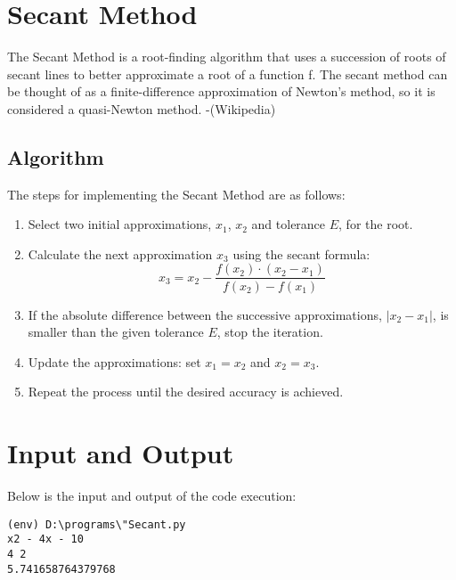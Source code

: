 \documentclass[12pt]{article}
\begin{document}
    
    \newpage
    \section*{Secant Method}

    
    The Secant Method is a root-finding algorithm that uses a succession of roots of secant lines to better approximate a root of a function f. The secant method can be thought of as a finite-difference approximation of Newton's method, so it is considered a quasi-Newton method. -(Wikipedia)
    
    \subsection*{Algorithm}
    The steps for implementing the Secant Method are as follows:
    
    \begin{enumerate}
        \item Select two initial approximations, \(x_1\), \(x_2\) and tolerance \(E\), for the root.
        \item Calculate the next approximation \(x_3\) using the secant formula:
        \[
            x_3 = x_2 - \frac{f(x_2) \cdot (x_2 - x_1)}{f(x_2) - f(x_1)}
        \]
            \item If the absolute difference between the successive approximations, \(|x_2 - x_1|\), is smaller than the given tolerance \(E\), stop the iteration.
            \item Update the approximations: set \(x_1 = x_2\) and \(x_2 = x_3\).
            \item Repeat the process until the desired accuracy is achieved.
        \end{enumerate}
        
        \section*{Input and Output}
        
        \noindent Below is the input and output of the code execution:
        
        {\small
        \begin{verbatim}
(env) D:\programs\"Secant.py
x2 - 4x - 10
4 2
5.741658764379768
        \end{verbatim}
        }
\end{document}
